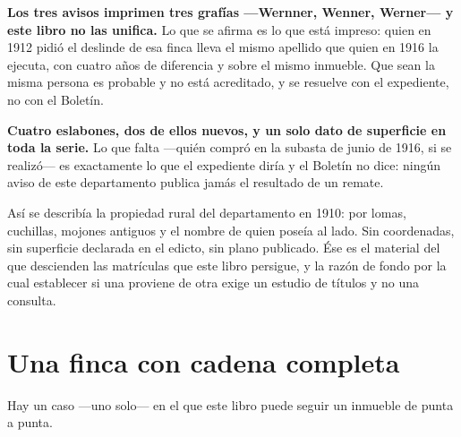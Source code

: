 \begin{cautela}
\textbf{Los tres avisos imprimen tres grafías ---Wernner, Wenner, Werner--- y este libro no las
unifica.} Lo que se afirma es lo que está impreso: quien en 1912 pidió el deslinde de esa finca lleva
el mismo apellido que quien en 1916 la ejecuta, con cuatro años de diferencia y sobre el mismo
inmueble. Que sean la misma persona es probable y no está acreditado, y se resuelve con el
expediente, no con el Boletín.
\end{cautela}

\textbf{Cuatro
eslabones, dos de ellos nuevos, y un solo dato de superficie en toda la serie.} Lo que falta ---quién
compró en la subasta de junio de 1916, si se realizó--- es exactamente lo que el expediente diría y
el Boletín no dice: ningún aviso de este departamento publica jamás el resultado de un remate.

Así se describía la propiedad rural del departamento en 1910: por lomas, cuchillas,
mojones antiguos y el nombre de quien poseía al lado. Sin coordenadas, sin superficie
declarada en el edicto, sin plano publicado. Ése es el material del que descienden las
matrículas que este libro persigue, y la razón de fondo por la cual establecer si una
proviene de otra exige un estudio de títulos y no una consulta.

\section{Una finca con cadena completa}

Hay un caso —uno solo— en el que este libro puede seguir un inmueble de punta a punta.

